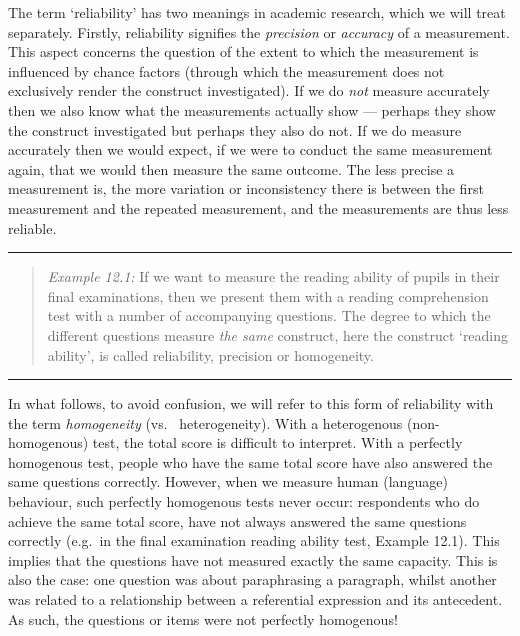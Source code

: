 \documentclass[
]{book}
\begin{document}
The term `reliability' has two meanings in academic research, which we
will treat separately. Firstly, reliability signifies the \emph{precision}
or \emph{accuracy} of a measurement. This aspect concerns the question of the extent
to which the measurement is influenced by chance factors (through which the
measurement does not exclusively render the construct investigated).
If we do \emph{not} measure
accurately then we also know what the measurements actually show ---
perhaps they show the construct investigated but perhaps they also do not. If we do
measure accurately then we would expect, if we were to conduct the same measurement again,
that we would then measure the same outcome. The less precise a measurement is, the more variation or inconsistency there is between the first measurement and the repeated measurement,
and the measurements are thus less reliable.

\begin{center}\rule{0.5\linewidth}{0.5pt}\end{center}

\begin{quote}
\emph{Example 12.1:} If we want to measure the reading ability
of pupils in their final examinations, then we present them
with a reading comprehension test with a number of accompanying questions.
The degree to which the different questions measure \emph{the same} construct, here the
construct `reading ability', is called reliability, precision or
homogeneity.
\end{quote}

\begin{center}\rule{0.5\linewidth}{0.5pt}\end{center}

In what follows, to avoid confusion, we will refer to this form
of reliability with the term \emph{homogeneity} (vs.~
heterogeneity). With a heterogenous (non-homogenous) test, the total score
is difficult to interpret. With a perfectly homogenous test, people
who have the same total score have also answered the same questions correctly.
However, when we measure human (language) behaviour, such perfectly homogenous tests
never occur: respondents who do achieve the same total score, have not
always answered the same questions correctly (e.g.~in the final examination
reading ability test, Example 12.1). This implies that the questions have not
measured exactly the same capacity. This is also the case: one question was about
paraphrasing a paragraph, whilst another was related to a relationship between
a referential expression and its antecedent.\\
As such, the questions or items were not perfectly homogenous!
\end{document}
